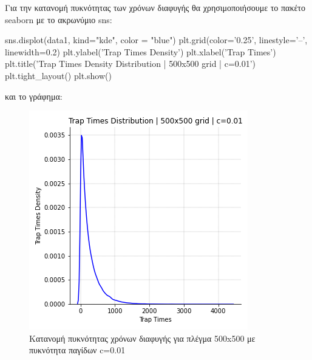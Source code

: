 Για την κατανομή πυκνότητας των χρόνων διαφυγής θα χρησιμοποιήσουμε το πακέτο {\en seaborn} με το ακρωνύμιο {\en sns}:
\en 
\begin{python}
sns.displot(data1, kind="kde", color = "blue")
plt.grid(color='0.25', linestyle='--', linewidth=0.2)
plt.ylabel('Trap Times Density')
plt.xlabel('Trap Times')
plt.title('Trap Times Density Distribution | 500x500 grid | c=0.01')
plt.tight_layout()
plt.show()
\end{python}
\gr και το γράφημα:
\begin{figure}[H]
\begin{center}
\includegraphics[scale=0.7]{figures/TRW_001_dens.png}
\caption{Κατανομή πυκνότητας χρόνων διαφυγής για πλέγμα 500{\en x}500 με πυκνότητα παγίδων {\en c}=0.01}
\label{figuridion3d}
\end{center}
\end{figure}
